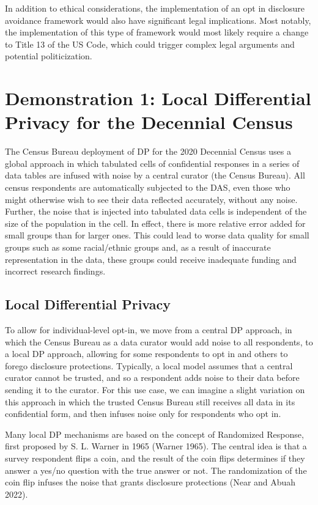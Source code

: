 \documentclass[
]{urban-formatting}
\begin{document}
In addition to ethical considerations, the implementation of an opt in
disclosure avoidance framework would also have significant legal
implications. Most notably, the implementation of this type of framework
would most likely require a change to Title 13 of the US Code, which
could trigger complex legal arguments and potential politicization.

\section{Demonstration 1: Local Differential Privacy for the Decennial Census}

The Census Bureau deployment of DP for the 2020 Decennial Census uses a
global approach in which tabulated cells of confidential responses in a
series of data tables are infused with noise by a central curator (the
Census Bureau). All census respondents are automatically subjected to
the DAS, even those who might otherwise wish to see their data reflected
accurately, without any noise. Further, the noise that is injected into
tabulated data cells is independent of the size of the population in the
cell. In effect, there is more relative error added for small groups
than for larger ones. This could lead to worse data quality for small
groups such as some racial/ethnic groups and, as a result of inaccurate
representation in the data, these groups could receive inadequate
funding and incorrect research findings.

\subsection{Local Differential Privacy}

To allow for individual-level opt-in, we move from a central DP
approach, in which the Census Bureau as a data curator would add noise
to all respondents, to a local DP approach, allowing for some
respondents to opt in and others to forego disclosure protections.
Typically, a local model assumes that a central curator cannot be
trusted, and so a respondent adds noise to their data before sending it
to the curator. For this use case, we can imagine a slight variation on
this approach in which the trusted Census Bureau still receives all data
in its confidential form, and then infuses noise only for respondents
who opt in.

Many local DP mechanisms are based on the concept of Randomized
Response, first proposed by S. L. Warner in 1965 (Warner 1965). The
central idea is that a survey respondent flips a coin, and the result of
the coin flips determines if they answer a yes/no question with the true
answer or not. The randomization of the coin flip infuses the noise that
grants disclosure protections (Near and Abuah 2022).
\end{document}
